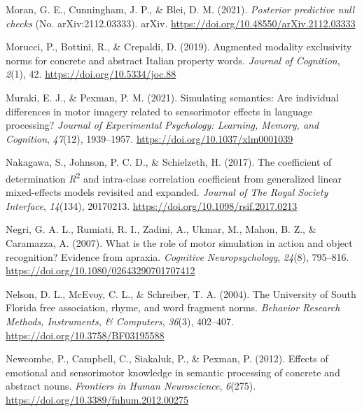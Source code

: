 \documentclass[
  12pt,
  man,floatsintext]{apa7}
\newlength{\cslhangindent}
\newlength{\cslentryspacingunit} %
\newenvironment{CSLReferences}[2] %
 {%
  \setlength{\parindent}{0pt}
  \ifodd #1
  \let\oldpar\par
  \def\par{\hangindent=\cslhangindent\oldpar}
  \fi
  \setlength{\parskip}{#2\cslentryspacingunit}
 }%
 {}
\begin{document}
\begin{CSLReferences}{1}{0}
\leavevmode{}%
Moran, G. E., Cunningham, J. P., \& Blei, D. M. (2021). \emph{Posterior predictive null checks} (No. arXiv:2112.03333). {arXiv}. \url{https://doi.org/10.48550/arXiv.2112.03333}

\leavevmode{}%
Morucci, P., Bottini, R., \& Crepaldi, D. (2019). Augmented modality exclusivity norms for concrete and abstract {Italian} property words. \emph{Journal of Cognition}, \emph{2}(1), 42. \url{https://doi.org/10.5334/joc.88}

\leavevmode{}%
Muraki, E. J., \& Pexman, P. M. (2021). Simulating semantics: {Are} individual differences in motor imagery related to sensorimotor effects in language processing? \emph{Journal of Experimental Psychology: Learning, Memory, and Cognition}, \emph{47}(12), 1939--1957. \url{https://doi.org/10.1037/xlm0001039}

\leavevmode{}%
Nakagawa, S., Johnson, P. C. D., \& Schielzeth, H. (2017). The coefficient of determination {\emph{R}}{\textsuperscript{2}} and intra-class correlation coefficient from generalized linear mixed-effects models revisited and expanded. \emph{Journal of The Royal Society Interface}, \emph{14}(134), 20170213. \url{https://doi.org/10.1098/rsif.2017.0213}

\leavevmode{}%
Negri, G. A. L., Rumiati, R. I., Zadini, A., Ukmar, M., Mahon, B. Z., \& Caramazza, A. (2007). What is the role of motor simulation in action and object recognition? {Evidence} from apraxia. \emph{Cognitive Neuropsychology}, \emph{24}(8), 795--816. \url{https://doi.org/10.1080/02643290701707412}

\leavevmode{}%
Nelson, D. L., McEvoy, C. L., \& Schreiber, T. A. (2004). The {University} of {South Florida} free association, rhyme, and word fragment norms. \emph{Behavior Research Methods, Instruments, \& Computers}, \emph{36}(3), 402--407. \url{https://doi.org/10.3758/BF03195588}

\leavevmode{}%
Newcombe, P., Campbell, C., Siakaluk, P., \& Pexman, P. (2012). Effects of emotional and sensorimotor knowledge in semantic processing of concrete and abstract nouns. \emph{Frontiers in Human Neuroscience}, \emph{6}(275). \url{https://doi.org/10.3389/fnhum.2012.00275}


\end{CSLReferences}
\end{document}
